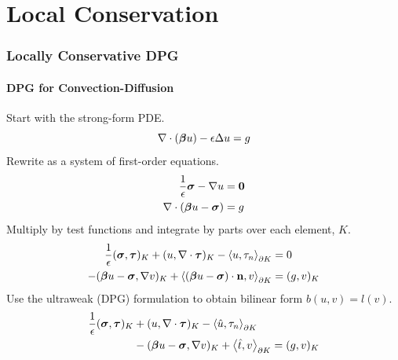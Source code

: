 \documentclass[18pt,xcolor=table]{beamer}
\begin{document}
%                      
%                      
%      
\section{Local Conservation}
\begin{frame}
\frametitle{Locally Conservative DPG}
\framesubtitle{DPG for Convection-Diffusion}
Start with the strong-form PDE.
\[
\nabla\cdot(\boldsymbol\beta u)-\epsilon\Delta u = g
\]
Rewrite as a system of first-order equations.
\begin{align*}
\frac{1}{\epsilon}\boldsymbol\sigma-\nabla u&=\boldsymbol0\\
\nabla\cdot(\boldsymbol\beta u-\boldsymbol\sigma)&=g
\end{align*}
Multiply by test functions and integrate by parts over each element, $K$.
\begin{align*}
\frac{1}{\epsilon}(\boldsymbol\sigma,\boldsymbol\tau)_K+(u,\nabla\cdot\boldsymbol\tau)_K
-\left\langle u,\tau_n \right\rangle_{\partial K}&=0\\
-(\boldsymbol\beta u-\boldsymbol\sigma,\nabla v)_K+\left\langle (\boldsymbol\beta
u-\boldsymbol\sigma)\cdot\mathbf{n},v \right\rangle_{\partial K}&=(g,v)_K
\end{align*}
Use the ultraweak (DPG) formulation to obtain bilinear form $b(u,v)=l(v)$.
\begin{align*}
\frac{1}{\epsilon}(\boldsymbol\sigma,\boldsymbol\tau)_K
&+(u,\nabla\cdot\boldsymbol\tau)_K-\left\langle \hat u,\tau_n \right\rangle_{\partial K}\\
&-(\boldsymbol\beta u-\boldsymbol\sigma,\nabla v)_K+\left\langle \hat t,v \right\rangle_{\partial K}
=(g,v)_K
\end{align*}
\end{frame}
\end{document}

